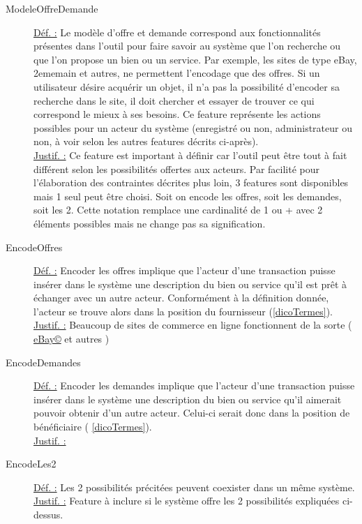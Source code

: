 \begin{description}
\item [ModeleOffreDemande]
\label{featOD}
\underline{Déf. :}  Le modèle d'offre et demande correspond aux fonctionnalités présentes dans l'outil pour faire savoir au système que l'on recherche ou que l'on propose un bien ou un service.  Par exemple,  les sites de type eBay,  2ememain et autres,  ne permettent l'encodage que des offres.  Si un utilisateur désire acquérir un objet,  il n'a pas la possibilité d'encoder sa recherche dans le site,  il doit chercher et essayer de trouver ce qui correspond le mieux à ses besoins.  Ce feature représente les actions possibles pour un acteur du système (enregistré ou non,  administrateur ou non,  à voir selon les autres features décrits ci-après).  
\\ \underline{Justif. :}  Ce feature est important à définir car l'outil peut être tout à fait différent selon les possibilités offertes aux acteurs.  Par facilité pour l'élaboration des contraintes décrites plus loin,  3 features sont disponibles mais 1 seul peut être choisi.  Soit on encode les offres,  soit les demandes,  soit les 2.  Cette notation remplace une cardinalité de 1 ou + avec 2 éléments possibles mais ne change pas sa signification.
\newline

\item [EncodeOffres]
\underline{Déf. :}  Encoder les offres implique que l'acteur d'une transaction puisse insérer dans le système une description du bien ou service qu'il est prêt à échanger avec un autre acteur.  Conformément à la définition donnée,  l'acteur se trouve alors dans la position du fournisseur (\ref{dicoTermes}).
\\ \underline{Justif. :}  Beaucoup de sites de commerce en ligne fonctionnent de la sorte ( \href{http://www.befr.ebay.be/}{eBay\copyright} et autres )
\newline

\item [EncodeDemandes]
\underline{Déf. :}  Encoder les demandes implique que l'acteur d'une transaction puisse insérer dans le système une description du bien ou service qu'il aimerait pouvoir obtenir d'un autre acteur.   Celui-ci serait donc dans la position de bénéficiaire ( \ref{dicoTermes}).
\\ \underline{Justif. :}  
\newline

\item [EncodeLes2]
\underline{Déf. :}  Les 2 possibilités précitées peuvent coexister dans un même système.
\\ \underline{Justif. :}  Feature à inclure si le système offre les 2 possibilités expliquées ci-dessus.
\newline


\end{description}
